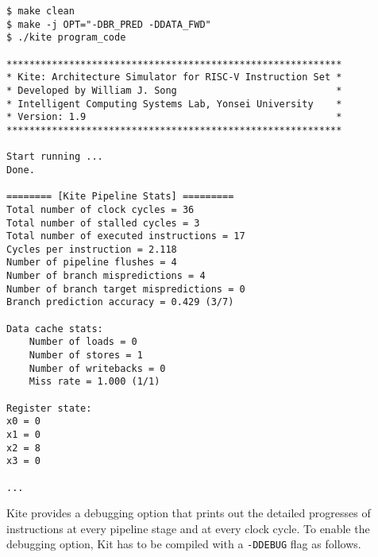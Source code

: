 \documentclass[10pt]{article}
\begin{document}
\begin{Verbatim}[frame=single]
$ make clean
$ make -j OPT="-DBR_PRED -DDATA_FWD"
$ ./kite program_code

***********************************************************
* Kite: Architecture Simulator for RISC-V Instruction Set *
* Developed by William J. Song                            *
* Intelligent Computing Systems Lab, Yonsei University    *
* Version: 1.9                                            *
***********************************************************

Start running ...
Done.

======== [Kite Pipeline Stats] =========
Total number of clock cycles = 36
Total number of stalled cycles = 3
Total number of executed instructions = 17
Cycles per instruction = 2.118
Number of pipeline flushes = 4
Number of branch mispredictions = 4
Number of branch target mispredictions = 0
Branch prediction accuracy = 0.429 (3/7)

Data cache stats:
    Number of loads = 0
    Number of stores = 1
    Number of writebacks = 0
    Miss rate = 1.000 (1/1)

Register state:
x0 = 0
x1 = 0
x2 = 8
x3 = 0

...

\end{Verbatim}

Kite provides a debugging option that prints out the detailed progresses of instructions at every pipeline stage and at every clock cycle.
To enable the debugging option, Kit has to be compiled with a {\tt -DDEBUG} flag as follows.
\end{document}

